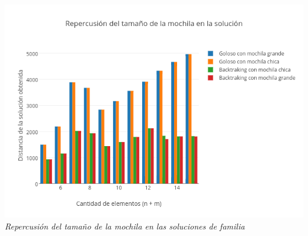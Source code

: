 \vspace*{0.3cm} \vspace*{0.3cm}
  \begin{center}
\includegraphics[scale=0.60]{./EJ2/randomMochila.png}
\\{\textit{Repercusión del tamaño de la mochila en las soluciones de familia}}
  \end{center}
  \vspace*{0.3cm}
  \begin{figure} [!ht]
 \centering
    \label{fig:comparativo1}
    \label{fig:comparativo2}
    \end{figure}
   

